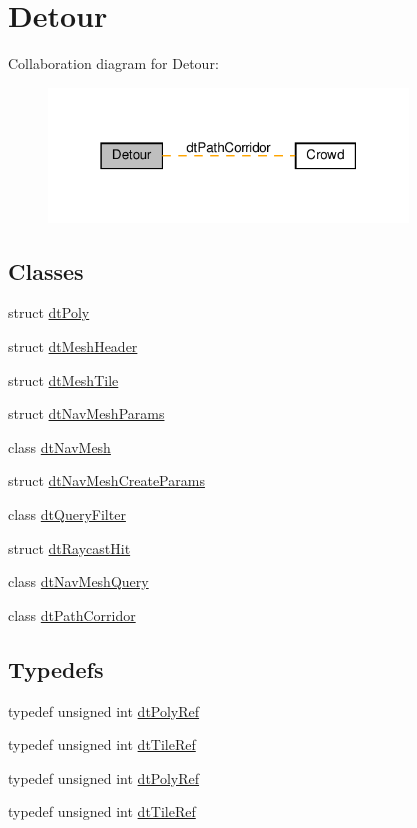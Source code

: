 \hypertarget{group__detour}{}\section{Detour}
\label{group__detour}
Collaboration diagram for Detour\+:
\nopagebreak
\begin{figure}[H]
\begin{center}
\leavevmode
\includegraphics[width=271pt]{group__detour}
\end{center}
\end{figure}
\subsection*{Classes}
\begin{DoxyCompactItemize}
\item 
struct \hyperlink{structdtPoly}{dt\+Poly}
\item 
struct \hyperlink{structdtMeshHeader}{dt\+Mesh\+Header}
\item 
struct \hyperlink{structdtMeshTile}{dt\+Mesh\+Tile}
\item 
struct \hyperlink{structdtNavMeshParams}{dt\+Nav\+Mesh\+Params}
\item 
class \hyperlink{classdtNavMesh}{dt\+Nav\+Mesh}
\item 
struct \hyperlink{structdtNavMeshCreateParams}{dt\+Nav\+Mesh\+Create\+Params}
\item 
class \hyperlink{classdtQueryFilter}{dt\+Query\+Filter}
\item 
struct \hyperlink{structdtRaycastHit}{dt\+Raycast\+Hit}
\item 
class \hyperlink{classdtNavMeshQuery}{dt\+Nav\+Mesh\+Query}
\item 
class \hyperlink{classdtPathCorridor}{dt\+Path\+Corridor}
\end{DoxyCompactItemize}
\subsection*{Typedefs}
\begin{DoxyCompactItemize}
\item 
typedef unsigned int \hyperlink{group__detour_gab4e0b2257a670c1a800057999612b466}{dt\+Poly\+Ref}
\item 
typedef unsigned int \hyperlink{group__detour_ga7ea56cfe01bd7c34a81d821d94cbeea5}{dt\+Tile\+Ref}
\item 
typedef unsigned int \hyperlink{group__detour_ga07c358f7bddf0fa2ef79e341a387c1dd}{dt\+Poly\+Ref}
\item 
typedef unsigned int \hyperlink{group__detour_ga608138970cbb12594287ea6523be24ef}{dt\+Tile\+Ref}
\end{DoxyCompactItemize}

